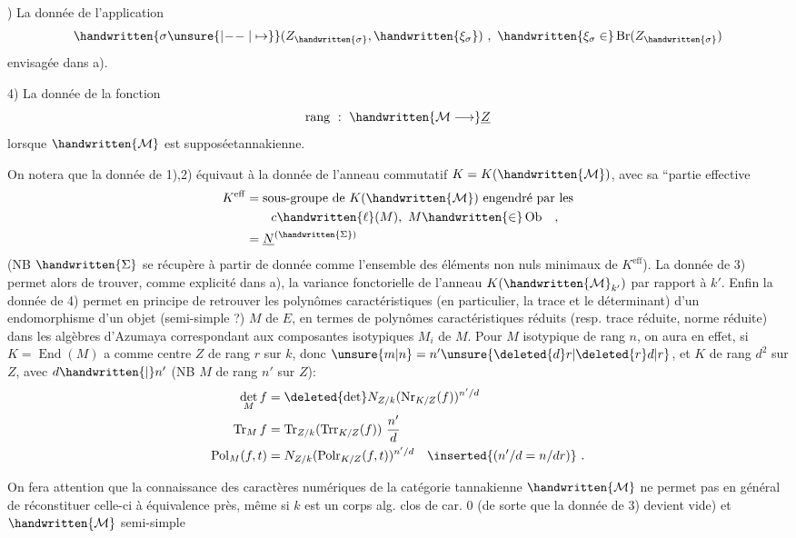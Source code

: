 ) La donnée de l'application
\[
\handwritten{\sigma\unsure{\mathrel{\vert\! -\! -}|\mapsto}}(Z_{\handwritten{\sigma}},\handwritten{\xi_\sigma})\ ,\ \handwritten{\xi_\sigma\in}\operatorname{Br}(Z_{\handwritten{\sigma}})
\]
envisagée dans a).

4) La donnée de la fonction
\[
\operatorname{rang}\ :\ \handwritten{\mathcal{M}\longrightarrow}\underline{Z}
\]
lorsque $\handwritten{\mathcal{M}}$ est supposéetannakienne.

On notera que la donnée de 1),2) équivaut à la donnée de l'anneau commutatif $K=K(\handwritten{\mathcal{M}})$, avec sa ``partie effective
\[
\begin{aligned}
K^{\mathrm{eff}}&=\text{sous-groupe de }K(\handwritten{\mathcal{M}})\text{ engendré par les}\\
&\qquad c\handwritten{\ell}(M),\ M\handwritten{\in}\operatorname{Ob}\quad,\\
&=\underline{N}^{(\handwritten{\Sigma})}
\end{aligned}
\]
(NB $\handwritten{\Sigma}$ se récupère à partir de  donnée comme l'ensemble des éléments non nuls minimaux de $K^{\mathrm{eff}}$). La donnée de 3) permet alors de trouver, comme explicité dans a), la variance fonctorielle de l'anneau $K(\handwritten{\mathcal{M}}_{k'})$ par rapport à $k'$. Enfin la donnée de 4) permet en principe de retrouver les polynômes caractéristiques (en particulier, la trace et le déterminant) d'un endomorphisme d'un objet (semi-simple ?) $M$ de $E$, en termes de polynômes caractéristiques réduits (resp. trace réduite, norme réduite) dans les algèbres d'Azumaya correspondant aux composantes isotypiques $M_i$ de $M$. Pour $M$ isotypique de rang $n$, on aura en effet, si $K=\operatorname{End}(M)$ a comme centre $Z$ de rang $r$ sur $k$, donc $\unsure{m|n}=n'\unsure{\deleted{d}r|\deleted{r}d|r}$, et $K$ de rang $d^2$ sur $Z$, avec $d\handwritten{\mid}n'$ (NB $M$ de rang $n'$ sur $Z$):
\[
\begin{aligned}
\det_M f&=\deleted{\det}N_{Z/k}(\operatorname{Nr}_{K/Z}(f))^{n'/d}\\
\operatorname{Tr}_M f&=\operatorname{Tr}_{Z/k}(\operatorname{Trr}_{K/Z}(f))\ \frac{n'}{d}\\
\operatorname{Pol}_M(f,t)&=N_{Z/k}(\operatorname{Polr}_{K/Z}(f,t))^{n'/d}\quad\inserted{(n'/d=n/dr)}\ .
\end{aligned}
\]

On fera attention que la connaissance des caractères numériques de la catégorie tannakienne $\handwritten{\mathcal{M}}$ ne permet pas en général de réconstituer celle-ci à équivalence près, même si $k$ est un corps alg. clos de car. 0 (de sorte que la donnée de 3) devient vide) et $\handwritten{\mathcal{M}}$ semi-simple

